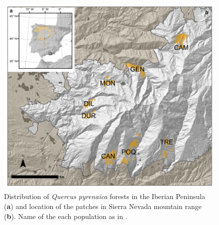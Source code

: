 \begin{figure}
	\centering
	\includegraphics[width=\textwidth]{img/multivariante/dist_map_multivariante} \caption{Distribution of \textit{Quercus pyrenaica} forests in the Iberian Peninsula (\textbf{a}) and location of the patches in Sierra Nevada mountain range (\textbf{b}). Name of the each population as in .}\label{fig:location-map}
\end{figure}

